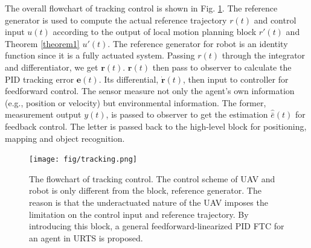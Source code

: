 \documentclass{ieeeaccess}
\begin{document}
The overall flowchart of tracking control is shown in Fig. \ref{fig:tracking}. The reference generator is used to compute the actual reference trajectory $r(t)$ and control input $u(t)$ according to the output of local motion planning block $r'(t)$ and Theorem \ref{theorem1} $u'(t)$. The reference generator for robot is an identity function since it is a fully actuated system. Passing $r(t)$ through the integrator and differentiator, we get $\pmb{r}(t)$. $\pmb{r}(t)$ then pass to observer to calculate the PID tracking error $\pmb{e}(t)$. Its differential, $\dot{\pmb{r}}(t)$, then input to controller for feedforward control. The sensor measure not only the agent's own information (e.g., position or velocity) but environmental information. The former, measurement output $y(t)$, is passed to observer to get the estimation $\hat{\bar{e}}(t)$ for feedback control. The letter is passed back to the high-level block for positioning, mapping and object recognition.

\begin{figure}[htbp]
    \centering
    \texttt{[image: fig/tracking.png]}\caption{The flowchart of tracking control. The control scheme of UAV and robot is only different from the block, reference generator. The reason is that the underactuated nature of the UAV imposes the limitation on the control input and reference trajectory. By introducing this block, a general feedforward-linearized PID FTC for an agent in URTS is proposed.}%
    \label{fig:tracking}
\end{figure}
\end{document}
